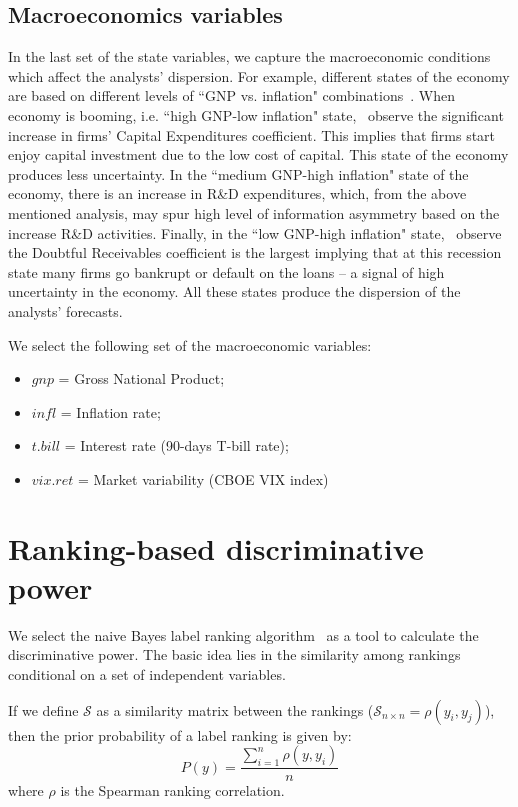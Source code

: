 \documentclass[12pt,a4paper]{article}\usepackage[]{graphicx}\usepackage[]{color}
\begin{document}
\subsection{Macroeconomics variables}
In the last set of the state variables, we  capture the macroeconomic conditions which affect the analysts' dispersion. For example, different states of the economy are based on  different levels of ``GNP vs. inflation" combinations~\citep{lev1993,hope2005}. When economy is booming, i.e. ``high GNP-low inflation" state,~\cite{lev1993} observe the significant increase in firms' Capital Expenditures coefficient. This implies that firms start enjoy capital investment due to the low cost of capital. This state of the economy produces less uncertainty. In the ``medium GNP-high inflation" state of the economy, there is an increase in R\&D expenditures, which, from the above mentioned analysis, may spur high level of information asymmetry based on the increase R\&D activities. Finally, in the ``low GNP-high inflation" state,~\cite{lev1993} observe the Doubtful Receivables coefficient is the largest implying that at this recession state many firms go bankrupt or default on the loans -- a signal of high uncertainty in the economy. All these states produce the dispersion of the analysts' forecasts.

We select the following set of the macroeconomic variables:
\begin{itemize}
\item $gnp$ = Gross National Product;
\item $infl$ = Inflation rate;
\item $t.bill$ = Interest rate (90-days T-bill rate);
\item $vix.ret$ = Market variability (CBOE VIX index)
\end{itemize}


\section{Ranking-based discriminative power}
\label{ch3-sec:labelranking}


We select the naive Bayes label ranking algorithm~\citep{aiguzhinov2010} as a tool to calculate the discriminative power. The basic idea lies in the similarity  among rankings conditional on a set of independent variables.

If we  define $\mathcal{S}$ as a similarity matrix between the rankings ($\mathcal{S}_{n \times n}=\rho(y_i,y_j)$), then the prior probability of a label ranking is given by:
\begin{equation}
P(y) = \frac{\sum_{i=1}^{n} \rho(y,y_i)}{n}
\end{equation}
where $\rho$ is the Spearman ranking correlation.
\end{document}
